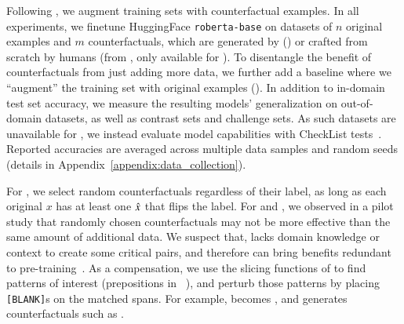 \label{subsec:augmentation}
Following \citet{kaushik2019learning}, we augment training sets with counterfactual examples.
In all experiments, we finetune HuggingFace \texttt{roberta-base} on datasets of $n$ original examples and $m$ counterfactuals, which are generated by \sysname (\maug) or crafted from scratch by humans (\mcad from  \citet{kaushik2019learning}, only available for \nli). To disentangle the benefit of counterfactuals from just adding more data, we further add a baseline where we ``augment'' the training set with original examples (\mcomp).
In addition to in-domain test set accuracy, we measure the resulting models' generalization on out-of-domain datasets, as well as contrast sets and challenge sets. As such datasets are unavailable for \qqp, we instead evaluate model capabilities with CheckList tests~\cite{checklist:acl20}.
Reported accuracies are averaged across multiple data samples and random seeds (details in Appendix~\ref{appendix:data_collection}).



For \sst, we select random \sysname counterfactuals regardless of their label, as long as each original $x$ has at least one $\hat{x}$ that flips the label.
For \nli and \qqp, we observed in a pilot study that randomly chosen counterfactuals may not be more effective than the same amount of additional data.
We suspect that, \sysname lacks domain knowledge or context to create some critical pairs, and therefore can bring benefits redundant to pre-training~\cite{longpre2020effective}.
As a compensation, we use the slicing functions of \citet{chen2019slice} to find patterns of interest (\eg prepositions in \nli~\cite{kim2019probing}), and perturb those patterns by placing \texttt{[BLANK]}s on the matched spans. For example,  becomes , and \sysname generates counterfactuals such as  .


